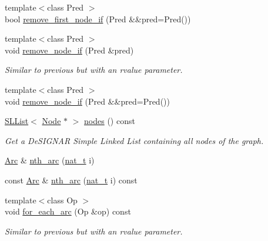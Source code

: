 \begin{DoxyCompactItemize}
{\footnotesize template$<$class Pred $>$ }\\bool \hyperlink{class_designar_1_1_base_graph_aec049416b5240910cb04b1d6f55fcecf}{remove\+\_\+first\+\_\+node\+\_\+if} (Pred \&\&pred=Pred())
\item 
{\footnotesize template$<$class Pred $>$ }\\void \hyperlink{class_designar_1_1_base_graph_aae56ca6b3b936835d07275f2ceb4b0d1}{remove\+\_\+node\+\_\+if} (Pred \&pred)
\begin{DoxyCompactList}\small\item\em Similar to previous but with an rvalue parameter. \end{DoxyCompactList}\item 
{\footnotesize template$<$class Pred $>$ }\\void \hyperlink{class_designar_1_1_base_graph_a6e63659d272255254f6abc29c1e09724}{remove\+\_\+node\+\_\+if} (Pred \&\&pred=Pred())
\item 
\hyperlink{class_designar_1_1_s_l_list}{S\+L\+List}$<$ \hyperlink{namespace_designar_a5af326c65aa2bd26b26c410f2030d09e}{Node} $\ast$ $>$ \hyperlink{class_designar_1_1_base_graph_a56b1ec4a0258d9f22542f33615bcdbea}{nodes} () const
\begin{DoxyCompactList}\small\item\em Get a De\+S\+I\+G\+N\+AR Simple Linked List containing all nodes of the graph. \end{DoxyCompactList}\item 
\hyperlink{namespace_designar_a3f55fb5513d62ff47cbc8f72b8e95d6f}{Arc} \& \hyperlink{class_designar_1_1_base_graph_a205d350fd588082a84d7a114ffd7cf5e}{nth\+\_\+arc} (\hyperlink{namespace_designar_aa72662848b9f4815e7bf31a7cf3e33d1}{nat\+\_\+t} i)
\item 
const \hyperlink{namespace_designar_a3f55fb5513d62ff47cbc8f72b8e95d6f}{Arc} \& \hyperlink{class_designar_1_1_base_graph_aaff3c76e0e0094d4ec1eaecd155ca951}{nth\+\_\+arc} (\hyperlink{namespace_designar_aa72662848b9f4815e7bf31a7cf3e33d1}{nat\+\_\+t} i) const
\item 
{\footnotesize template$<$class Op $>$ }\\void \hyperlink{class_designar_1_1_base_graph_ac46a1a7517a6c7029c6bae23d480cfa9}{for\+\_\+each\+\_\+arc} (Op \&op) const
\begin{DoxyCompactList}\small\item\em Similar to previous but with an rvalue parameter. \end{DoxyCompactList}\item 

\end{DoxyCompactItemize}

